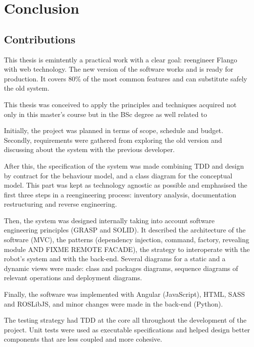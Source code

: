 \chapter{Conclusion}
\section{Contributions}
This thesis is emintently a practical work with a clear goal: reengineer Flango \cm with web technology.
The new version of the software works and is ready for production.
It covers 80\% of the most common features and can substitute safely the old \flash system.


This thesis was conceived to apply the principles and techniques acquired not only in this master's course but in the BSc degree as well related to 


Initially, the project was planned in terms of scope, schedule and budget.
Secondly, requirements were gathered from exploring the old version and discussing about the system with the previous developer.

After this, the specification of the system was made combining \ac{TDD} and design by contract for the behaviour model, and a class diagram for the conceptual model.
This part was kept as technology agnostic as possible and emphasised the first three steps in a reengineering process: inventory analysis, documentation restructuring and reverse engineering.

Then, the system was designed internally taking into account software engineering principles (\ac{GRASP} and \ac{SOLID}).
It described the architecture of the software (\ac{MVC}), the patterns (dependency injection, command, factory, revealing module AND FIXME REMOTE FACADE), the strategy to interoperate with the robot's system and with the back-end.
Several diagrams for a static and a dynamic views were made: class and packages diagrams, sequence diagrams of relevant operations and deployment diagrams.

Finally, the software was implemented with Angular (JavaScript), HTML, SASS and ROSLibJS, and minor changes were made in the back-end (Python).

The testing strategy had \ac{TDD} at the core all throughout the development of the project.
Unit tests were used as executable specifications and helped design better components that are less coupled and more cohesive.

